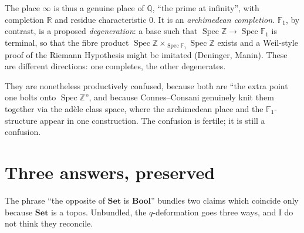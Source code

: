 \documentclass[11pt,a4paper]{article}
\theoremstyle{definition}
\theoremstyle{remark}
\newcommand{\FF}{\mathbb{F}}
\newcommand{\RR}{\mathbb{R}}
\newcommand{\QQ}{\mathbb{Q}}
\newcommand{\ZZ}{\mathbb{Z}}
\newcommand{\cat}[1]{\mathbf{#1}}
\newcommand{\Set}{\cat{Set}}
\newcommand{\Bool}{\cat{Bool}}
\DeclareMathOperator{\Spec}{Spec}
\begin{document}
The place $\infty$ is thus a genuine place of $\QQ$, ``the prime at infinity'', with completion
$\RR$ and residue characteristic $0$. It is an \emph{archimedean completion}. $\FF_1$, by
contrast, is a proposed \emph{degeneration}: a base such that $\Spec \ZZ \to \Spec \FF_1$ is
terminal, so that the fibre product $\Spec\ZZ \times_{\Spec \FF_1} \Spec\ZZ$ exists and a
Weil-style proof of the Riemann Hypothesis might be imitated (Deninger, Manin). These are
different directions: one completes, the other degenerates.

They are nonetheless productively confused, because both are ``the extra point one bolts onto
$\Spec \ZZ$'', and because Connes--Consani genuinely knit them together via the ad\`ele class
space, where the archimedean place and the $\FF_1$-structure appear in one construction. The
confusion is fertile; it is still a confusion.

\section{Three answers, preserved}

The phrase ``the opposite of $\Set$ is $\Bool$'' bundles two claims which coincide only because
$\Set$ is a topos. Unbundled, the $q$-deformation goes three ways, and I do not think they
reconcile.
\end{document}
